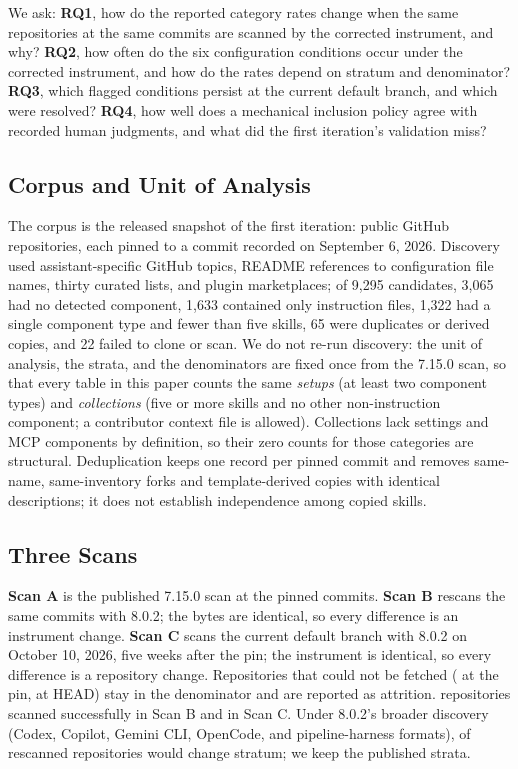 \documentclass[10pt,conference]{IEEEtran}
\newcommand{\vold}{7.15.0}
\newcommand{\vnew}{8.0.2}
\begin{document}
We ask: \textbf{RQ1}, how do the reported category rates change when the same repositories at the same commits are scanned by the corrected instrument, and why? \textbf{RQ2}, how often do the six configuration conditions occur under the corrected instrument, and how do the rates depend on stratum and denominator? \textbf{RQ3}, which flagged conditions persist at the current default branch, and which were resolved? \textbf{RQ4}, how well does a mechanical inclusion policy agree with recorded human judgments, and what did the first iteration's validation miss?

\subsection{Corpus and Unit of Analysis}

The corpus is the released snapshot of the first iteration: \NCorpus{} public GitHub repositories, each pinned to a commit recorded on September 6, 2026. Discovery used assistant-specific GitHub topics, README references to configuration file names, thirty curated lists, and plugin marketplaces; of 9,295 candidates, 3,065 had no detected component, 1,633 contained only instruction files, 1,322 had a single component type and fewer than five skills, 65 were duplicates or derived copies, and 22 failed to clone or scan. We do not re-run discovery: the unit of analysis, the strata, and the denominators are fixed once from the \vold{} scan, so that every table in this paper counts the same \NSetups{} \emph{setups} (at least two component types) and \NCollections{} \emph{collections} (five or more skills and no other non-instruction component; a contributor context file is allowed). Collections lack settings and MCP components by definition, so their zero counts for those categories are structural. Deduplication keeps one record per pinned commit and removes same-name, same-inventory forks and template-derived copies with identical descriptions; it does not establish independence among copied skills.

\subsection{Three Scans}

\textbf{Scan A} is the published \vold{} scan at the pinned commits. \textbf{Scan B} rescans the same commits with \vnew{}; the bytes are identical, so every difference is an instrument change. \textbf{Scan C} scans the current default branch with \vnew{} on October 10, 2026, five weeks after the pin; the instrument is identical, so every difference is a repository change. Repositories that could not be fetched (\NPinnedUnfetchable{} at the pin, \NHeadUnfetchable{} at HEAD) stay in the denominator and are reported as attrition. \NPinnedOk{} repositories scanned successfully in Scan B and \NHeadOk{} in Scan C. Under \vnew{}'s broader discovery (Codex, Copilot, Gemini CLI, OpenCode, and pipeline-harness formats), \StratumChanged{} of \StratumChangedOf{} rescanned repositories would change stratum; we keep the published strata.
\end{document}

